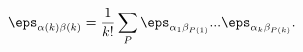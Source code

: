 \begin{equation}
\eps_{\alpha(k)\beta(k)}=\frac{1}{k!}\sum_P
\eps_{\alpha_1\beta_{P(1)}}...
\eps_{\alpha_k\beta_{P(k)}}.
\end{equation}

